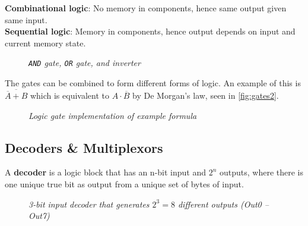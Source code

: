 \documentclass[11pt]{article}
\begin{document}
\begin{tcolorbox}[
    enhanced,
    attach boxed title to top left={xshift=6mm,yshift=-1.5mm},
    colback=moonstoneblue!20,
    colframe=moonstoneblue,
    colbacktitle=moonstoneblue,
    title=Two types of logic systems,
    fonttitle=\bfseries\color{white},
    boxed title style={size=small,colframe=moonstoneblue,sharp corners},
    sharp corners,
]
    {\color{moondark}\textbf{Combinational logic}}: No memory in components, hence same output given same input. \\
    {\color{moondark}\textbf{Sequential logic}}: Memory in components, hence output depends on input and current memory state.
\end{tcolorbox}

\begin{figure}[htbp]
    \centering
    \caption{\textit{\texttt{AND} gate, \texttt{OR} gate, and inverter}}
\end{figure}

The gates can be combined to form different forms of logic. An example of this is $\overline{\overline{A} + B}$ which is equivalent to $A \cdot \overline{B}$ by De Morgan's law, seen in \autoref{fig:gates2}.

\begin{figure}[htbp]
    \centering
    \caption{\textit{Logic gate implementation of example formula}}
    \label{fig:gates2}
\end{figure}

\subsection*{Decoders \& Multiplexors}

A \textbf{decoder} is a logic block that has an n-bit input and $2^n$ outputs, where there is one unique true bit as output from a unique set of bytes of input.

\begin{figure}[htbp]
    \centering
    \caption{\textit{3-bit input decoder that generates $2^3=8$ different outputs (Out0 – Out7)}}
\end{figure}
\end{document}
